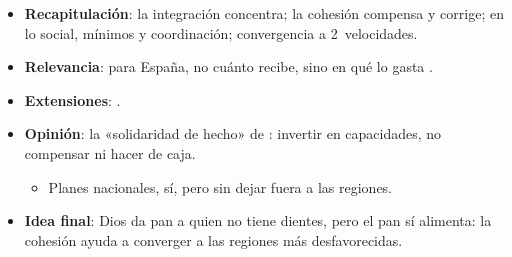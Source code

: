 \documentclass{article}
\begin{document}
\begin{columnas}
\begin{itemize}
\item \textbf{Recapitulación}: la integración concentra; la cohesión compensa y corrige; en lo social, mínimos y coordinación; convergencia a 2~velocidades.
\item \textbf{Relevancia}: para España, no cuánto recibe, sino en qué lo gasta .
\item \textbf{Extensiones}:    .
\item \textbf{Opinión}: la «solidaridad de hecho» de : invertir en capacidades, no compensar ni hacer de caja.
  \begin{itemize}
  \item Planes nacionales, sí, pero sin dejar fuera a las regiones.
  \end{itemize}
\item \textbf{Idea final}: Dios da pan a quien no tiene dientes, pero el pan sí alimenta: la cohesión ayuda a converger a las regiones más desfavorecidas.
\end{itemize}


\end{columnas}
\end{document}
